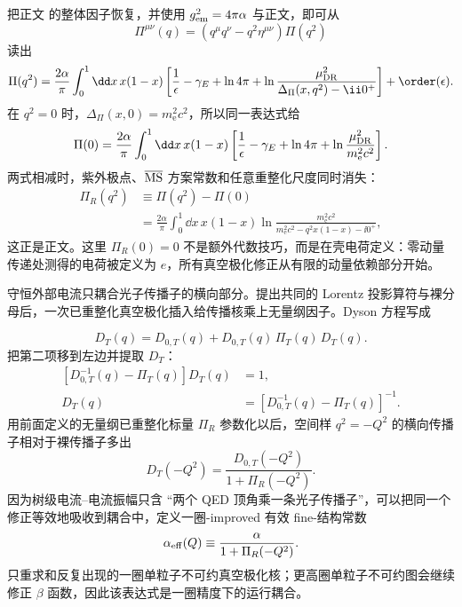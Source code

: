 \begin{derivation}
把正文 的整体因子恢复，并使用 $g_{\rm em}^2=4\pi\alpha$ 与正文，即可从
\[
\Pi^{\mu\nu}(q)
=(q^\mu q^\nu-q^2\eta^{\mu\nu})\Pi(q^2)
\]
读出
\begin{align*}
\Pi(q^2)
=\frac{2\alpha}{\pi}
\int_0^1\dd x\,x(1-x)
\left[
\frac1\epsilon-\gamma_E+\ln4\pi
+\ln\frac{\mu_{\rm DR}^2}
{\Delta_\Pi(x,q^2)-\ii0^+}
\right]
+\order(\epsilon).
\end{align*}
在 $q^2=0$ 时，$\Delta_\Pi(x,0)=m_{\mathrm e}^2c^2$，所以同一表达式给
\begin{align*}
\Pi(0)
=\frac{2\alpha}{\pi}
\int_0^1\dd x\,x(1-x)
\left[
\frac1\epsilon-\gamma_E+\ln4\pi
+\ln\frac{\mu_{\rm DR}^2}{m_{\mathrm e}^2c^2}
\right].
\end{align*}
两式相减时，紫外极点、$\overline{\rm MS}$ 方案常数和任意重整化尺度同时消失：
\begin{align*}
\Pi_R(q^2)
&\equiv\Pi(q^2)-\Pi(0)\\
&=\frac{2\alpha}{\pi}
\int_0^1\dd x\,x(1-x)
\ln\frac{m_{\mathrm e}^2c^2}
{m_{\mathrm e}^2c^2-q^2x(1-x)-\ii0^+},
\end{align*}
这正是正文。这里 $\Pi_R(0)=0$ 不是额外代数技巧，而是在壳电荷定义：零动量传递处测得的电荷被定义为 $e$，所有真空极化修正从有限的动量依赖部分开始。
\end{derivation}

\begin{derivation}[真空极化插入与有效电荷]
守恒外部电流只耦合光子传播子的横向部分。提出共同的 Lorentz 投影算符与裸分母后，一次已重整化真空极化插入给传播核乘上无量纲因子。Dyson 方程写成

\begin{equation*}
 D_T(q)=D_{0,T}(q)+D_{0,T}(q)\,\Pi_T(q)\,D_T(q).
 \end{equation*}
把第二项移到左边并提取 $D_T$：
\begin{align*}
 \left[D_{0,T}^{-1}(q)-\Pi_T(q)\right]D_T(q)&=1,\\
 D_T(q)&=\left[D_{0,T}^{-1}(q)-\Pi_T(q)\right]^{-1}.
\end{align*}
用前面定义的无量纲已重整化标量 $\Pi_R$ 参数化以后，空间样 $q^2=-Q^2$ 的横向传播子相对于裸传播子多出
\begin{equation*}
 {
 D_T(-Q^2)=\frac{D_{0,T}(-Q^2)}{1+\Pi_R(-Q^2)}.}
 \end{equation*}
因为树级电流--电流振幅只含 ``两个 QED 顶角乘一条光子传播子''，可以把同一个修正等效地吸收到耦合中，定义一圈-improved 有效 fine-结构常数
\begin{equation*}
 {
 \alpha_{\rm eff}(Q)
 \equiv
 \frac{\alpha}{1+\Pi_R(-Q^2)}.}
 \end{equation*}
 只重求和反复出现的一圈单粒子不可约真空极化核；更高圈单粒子不可约图会继续修正 $\beta$ 函数，因此该表达式是一圈精度下的运行耦合。
\end{derivation}

